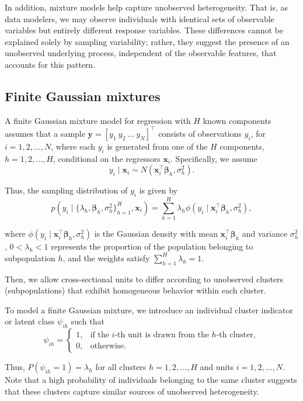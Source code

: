 In addition, mixture models help capture unobserved heterogeneity. That is, as data modelers, we may observe individuals with identical sets of observable variables but entirely different response variables. These differences cannot be explained solely by sampling variability; rather, they suggest the presence of an unobserved underlying process, independent of the observable features, that accounts for this pattern.

\subsection{Finite Gaussian mixtures}\label{sec11_11}
A finite Gaussian mixture model for regression with \( H \) known components assumes that a sample 
\( \bm{y}=\left[y_1 \ y_2 \ \dots \ y_N\right]^{\top} \) consists of observations \( y_i \), 
for \( i=1,2,\dots,N \), where each \( y_i \) is generated from one of the \( H \) components, 
\( h=1,2,\dots,H \), conditional on the regressors \( \bm{x}_i \). Specifically, we assume  
\[
y_i \mid \bm{x}_i \sim N(\bm{x}_i^{\top}\bm{\beta}_h, \sigma_h^2).
\]

Thus, the sampling distribution of \( y_i \) is given by  
\[
p(y_i \mid \{\lambda_h, \bm{\beta}_h, \sigma_h^2\}_{h=1}^H, \bm{x}_i) = 
\sum_{h=1}^H \lambda_h \phi(y_i \mid \bm{x}_i^{\top}\bm{\beta}_h, \sigma_h^2),
\]

where \( \phi(y_i \mid \bm{x}_i^{\top}\bm{\beta}_h, \sigma_h^2) \) is the Gaussian density with mean 
\( \bm{x}_i^{\top}\bm{\beta}_h \) and variance \( \sigma_h^2 \), \( 0 < \lambda_h < 1 \) represents 
the proportion of the population belonging to subpopulation \( h \), and the weights satisfy 
\( \sum_{h=1}^H \lambda_h = 1 \).

Then, we allow cross-sectional units to differ according to unobserved clusters (subpopulations) that exhibit homogeneous behavior within each cluster.

To model a finite Gaussian mixture, we introduce an individual cluster indicator or latent class \( \psi_{ih} \) such that  
\[
\psi_{ih}=
\begin{cases}
	1, & \text{if the } i\text{-th unit is drawn from the } h\text{-th cluster}, \\
	0, & \text{otherwise}.
\end{cases}
\]

Thus, \( P(\psi_{ih}=1) = \lambda_h \) for all clusters \( h=1,2,\dots,H \) and units \( i=1,2,\dots,N \). Note that a high probability of individuals belonging to the same cluster suggests that these clusters capture similar sources of unobserved heterogeneity.

